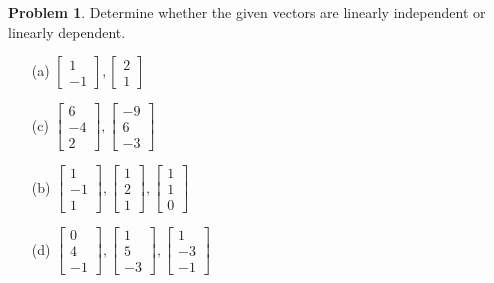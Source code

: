 \documentclass[10pt]{article}
\theoremstyle{definition}
\newtheorem{problem}[theorem]{Problem}
\newcommand{\1}[1]{\textbf{1}_{\left[#1\right]}} %
\begin{document}
\begin{problem}
  Determine whether the given vectors are linearly independent or linearly
  dependent.
  
  \noindent
  \begin{center}
    \begin{minipage}{0.45\linewidth}
      \begin{enumerate}[(a)]
        \item[(a)] $\begin{bmatrix} 1\\-1
        \end{bmatrix},
        \begin{bmatrix}
          2\\1
        \end{bmatrix}$
        \item[(c)] $\begin{bmatrix} 6\\-4\\2
        \end{bmatrix},
        \begin{bmatrix}
          -9\\6\\-3
        \end{bmatrix}$
      \end{enumerate}
    \end{minipage}%
    \begin{minipage}{0.45\linewidth}
      \begin{enumerate}[(a)]\setcounter{enumi}{2}
        \item[(b)] $\begin{bmatrix} 1\\-1\\1
        \end{bmatrix},
        \begin{bmatrix}
          1\\2\\1
        \end{bmatrix},
        \begin{bmatrix}
          1\\1\\0
        \end{bmatrix}$
        \item[(d)] $\begin{bmatrix} 0\\4\\-1
        \end{bmatrix},
        \begin{bmatrix}
          1\\5\\-3
        \end{bmatrix},
        \begin{bmatrix}
          1\\-3\\-1
        \end{bmatrix}$
      \end{enumerate}
    \end{minipage}
  \end{center}
\end{problem}
\end{document}
